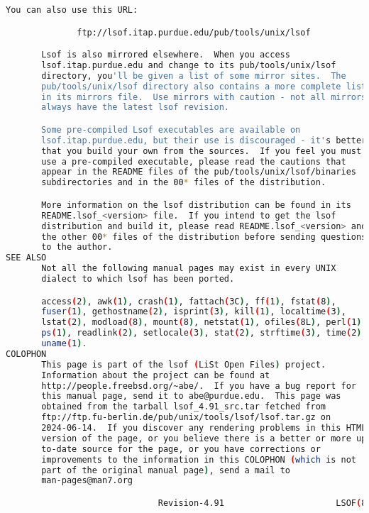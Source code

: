 {{\begin{lstlisting}[language=bash]
       You can also use this URL:

              ftp://lsof.itap.purdue.edu/pub/tools/unix/lsof

       Lsof is also mirrored elsewhere.  When you access
       lsof.itap.purdue.edu and change to its pub/tools/unix/lsof
       directory, you'll be given a list of some mirror sites.  The
       pub/tools/unix/lsof directory also contains a more complete list
       in its mirrors file.  Use mirrors with caution - not all mirrors
       always have the latest lsof revision.

       Some pre-compiled Lsof executables are available on
       lsof.itap.purdue.edu, but their use is discouraged - it's better
       that you build your own from the sources.  If you feel you must
       use a pre-compiled executable, please read the cautions that
       appear in the README files of the pub/tools/unix/lsof/binaries
       subdirectories and in the 00* files of the distribution.

       More information on the lsof distribution can be found in its
       README.lsof_<version> file.  If you intend to get the lsof
       distribution and build it, please read README.lsof_<version> and
       the other 00* files of the distribution before sending questions
       to the author.
SEE ALSO
       Not all the following manual pages may exist in every UNIX
       dialect to which lsof has been ported.

       access(2), awk(1), crash(1), fattach(3C), ff(1), fstat(8),
       fuser(1), gethostname(2), isprint(3), kill(1), localtime(3),
       lstat(2), modload(8), mount(8), netstat(1), ofiles(8L), perl(1),
       ps(1), readlink(2), setlocale(3), stat(2), strftime(3), time(2),
       uname(1).
COLOPHON
       This page is part of the lsof (LiSt Open Files) project.
       Information about the project can be found at 
       http://people.freebsd.org/~abe/.  If you have a bug report for
       this manual page, send it to abe@purdue.edu.  This page was
       obtained from the tarball lsof_4.91_src.tar fetched from
       ftp://ftp.fu-berlin.de/pub/unix/tools/lsof/lsof.tar.gz on
       2024-06-14.  If you discover any rendering problems in this HTML
       version of the page, or you believe there is a better or more up-
       to-date source for the page, or you have corrections or
       improvements to the information in this COLOPHON (which is not
       part of the original manual page), send a mail to
       man-pages@man7.org

                              Revision-4.91                      LSOF(8)\end{lstlisting}
}}
\endinput  %

